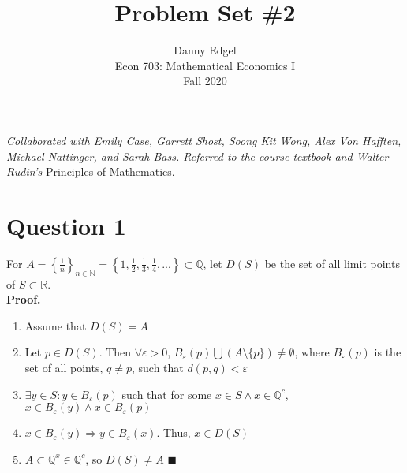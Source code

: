 \documentclass{article}
\newcommand{\N}{\mathbb{N}}
\newcommand{\R}{\mathbb{R}}
\newcommand{\Q}{\mathbb{Q}}
\begin{document}
\title{	Problem Set \#2 }
\author{ 	Danny Edgel 							\\ 
			Econ 703: Mathematical Economics I		\\
			Fall 2020								\\
		}
\maketitle\thispagestyle{empty}


\textit{Collaborated with Emily Case, Garrett Shost, Soong Kit Wong, Alex Von Hafften, Michael Nattinger, and Sarah Bass. Referred to the course textbook and Walter Rudin's} Principles of Mathematics.


\section*{Question 1}

For $A=\left\{\frac{1}{n}\right\}_{n\in\N}=\left\{1,\frac{1}{2},\frac{1}{3},\frac{1}{4},...\right\}\subset\Q$, let $D(S)$ be the set of all limit points of $S\subset\R$.
\medskip \\
\textbf{Proof.}
\begin{enumerate}
	\item Assume that $D(S)=A$
	
	\item Let $p\in D(S)$. Then $\forall\varepsilon>0$, $B_\varepsilon(p)\bigcup(A\setminus \{p\})\neq\emptyset$, where $B_\varepsilon(p)$ is the set of all points, $q\neq p$, such that $d(p,q)<\varepsilon$
	
	\item $\exists y\in S: y\in B_\varepsilon(p)$ such that for some $x\in S\wedge x\in\Q^c$, $x\in B_\varepsilon(y)\wedge x\in B_\varepsilon(p)$
	
	\item $x\in B_\varepsilon(y)\Rightarrow y\in B_\varepsilon(x)$. Thus, $x\in D(S)$
	
	\item $A\subset\Q ^ x\in\Q^c$, so $D(S)\neq A$ $\blacksquare$
\end{enumerate}



\end{document}

